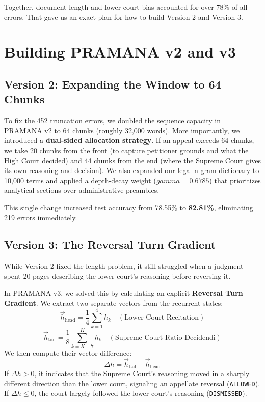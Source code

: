 \documentclass[11pt,a4paper]{article}
\begin{document}
Together, document length and lower-court bias accounted for over 78\% of all errors. That gave us an exact plan for how to build Version 2 and Version 3.

\section{Building PRAMANA v2 and v3}

\subsection{Version 2: Expanding the Window to 64 Chunks}
To fix the 452 truncation errors, we doubled the sequence capacity in PRAMANA v2 to 64 chunks (roughly 32,000 words). More importantly, we introduced a \textbf{dual-sided allocation strategy}. If an appeal exceeds 64 chunks, we take 20 chunks from the front (to capture petitioner grounds and what the High Court decided) and 44 chunks from the end (where the Supreme Court gives its own reasoning and decision). We also expanded our legal n-gram dictionary to 10,000 terms and applied a depth-decay weight ($gamma = 0.6785$) that prioritizes analytical sections over administrative preambles.

This single change increased test accuracy from 78.55\% to \textbf{82.81\%}, eliminating 219 errors immediately.

\subsection{Version 3: The Reversal Turn Gradient}
While Version 2 fixed the length problem, it still struggled when a judgment spent 20 pages describing the lower court's reasoning before reversing it.

In PRAMANA v3, we solved this by calculating an explicit \textbf{Reversal Turn Gradient}. We extract two separate vectors from the recurrent states:
\begin{equation}
\vec{h}_{\text{head}} = \frac{1}{4} \sum_{k=1}^4 h_k \quad (\text{Lower-Court Recitation})
\end{equation}
\begin{equation}
\vec{h}_{\text{tail}} = \frac{1}{8} \sum_{k=K-7}^K h_k \quad (\text{Supreme Court Ratio Decidendi})
\end{equation}
We then compute their vector difference:
\begin{equation}
\Delta h = \vec{h}_{\text{tail}} - \vec{h}_{\text{head}}
\end{equation}
If $\Delta h > 0$, it indicates that the Supreme Court's reasoning moved in a sharply different direction than the lower court, signaling an appellate reversal (\texttt{ALLOWED}). If $\Delta h \le 0$, the court largely followed the lower court's reasoning (\texttt{DISMISSED}).
\end{document}
